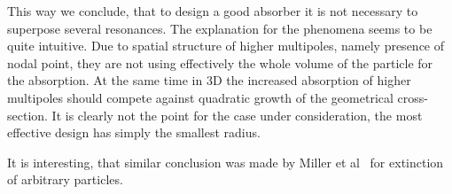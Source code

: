 \documentclass[aps,prl,twocolumn,showpacs,superscriptaddress,groupedaddress]{revtex4-1}
\begin{document}

This way we conclude, that to design a good absorber it is not
necessary to superpose several resonances.  The explanation for the
phenomena seems to be quite intuitive.  Due to spatial structure of
higher multipoles, namely presence of nodal point, they are not using
effectively the whole volume of the particle for the absorption. At
the same time in 3D the increased absorption of higher multipoles should
compete against quadratic growth of the geometrical cross-section.  It
is clearly not the point for the case under consideration, the most
effective design has simply the smallest radius.


It is interesting, that similar conclusion was made by Miller et
al~\cite{Miller-2014} for extinction of arbitrary particles.



\end{document}
